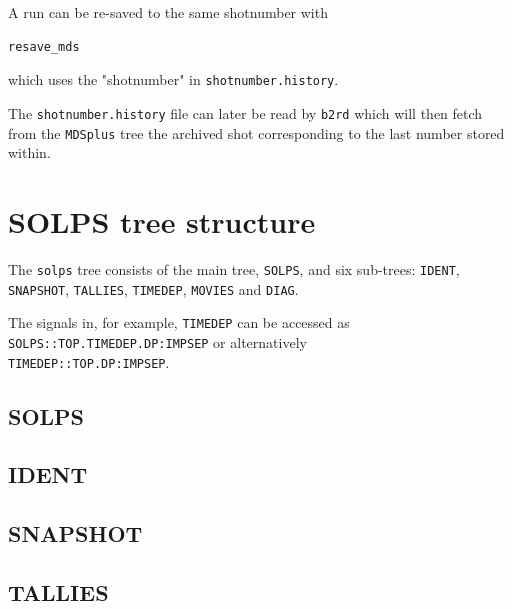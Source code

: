 \documentclass[a4paper,10pt]{report}
\begin{document}
A run can be re-saved to the same shotnumber with
\begin{verbatim}
resave_mds
\end{verbatim}
which uses the "shotnumber" in {\tt shotnumber.history}.

The {\tt shotnumber.history} file can later be read by {\tt b2rd} which will
then fetch from the {\tt MDSplus} tree the archived shot corresponding to
the last number stored within.

\section{SOLPS tree structure}


The {\tt solps} tree consists of the main tree, {\tt SOLPS}, and six sub-trees: {\tt IDENT},
{\tt SNAPSHOT}, {\tt TALLIES}, {\tt TIMEDEP}, {\tt MOVIES} and {\tt DIAG}.

The signals in, for example, {\tt TIMEDEP} can be accessed as
{\tt \\SOLPS::TOP.TIMEDEP.DP:IMPSEP} or alternatively
{\tt \\TIMEDEP::TOP.DP:IMPSEP}.

\subsection{SOLPS}


\subsection{IDENT}


\subsection{SNAPSHOT}


\subsection{TALLIES}
\end{document}
